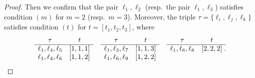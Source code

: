 \documentclass{math}
\theoremstyle{plain}
\numberwithin{equation}{section}
\begin{document}
\begin{proof}
%
Then we confirm that the pair ${\ell}_1, {\ell}_2$ (resp.~the pair  ${\ell}_1, {\ell}_3$) satisfies condition $(m)$ for $m=2$
 (resp.~$m=3$).
Moreover, 
the triple $\tau=\{{\ell}_i, {\ell}_j, {\ell}_k\}$ satisfies condition $(t)$ for $t=[t_1, t_2, t_3]$,
where
\[
\begin{array}{cc}
\tau & t \\
\hline 
{\ell}_1, {\ell}_4, {\ell}_5 & [1,1,1]\\
{\ell}_1, {\ell}_4, {\ell}_6 & [1,1,2]\\
\end{array}
\quad
\begin{array}{cc}
\tau & t \\
\hline 
{\ell}_1, {\ell}_3, {\ell}_7 & [1,1,3]\\
{\ell}_1, {\ell}_6, {\ell}_9& [1,2,2]\\
\end{array}
\quad
\begin{array}{cc}
\tau & t \\
\hline 
{\ell}_1, {\ell}_6, {\ell}_8 & [2,2,2]\rlap{\;.}\\
 & 
\end{array}
\]
%
%
%
\end{proof}
\end{document}
